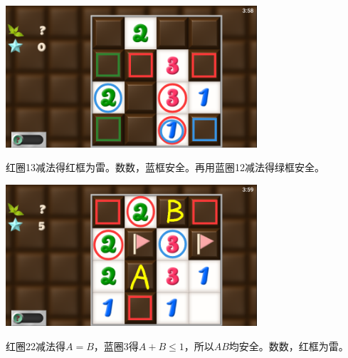 \subsection{} %
\begin{center}
    \includegraphics[width=0.7\textwidth]{puzzle/99-1.png}
\end{center}
红圈13减法得红框为雷。数数，蓝框安全。再用蓝圈12减法得绿框安全。
\begin{center}
    \includegraphics[width=0.7\textwidth]{puzzle/99-2.png}
\end{center}
红圈22减法得$A=B$，蓝圈3得$A+B\le 1$，所以$AB$均安全。数数，红框为雷。

